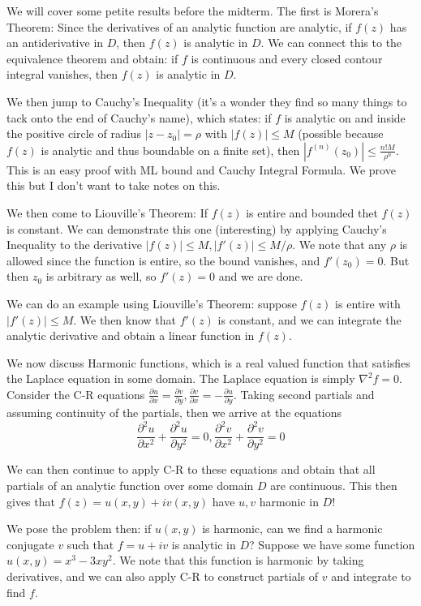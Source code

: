 \documentclass[10pt]{report}
\newcommand{\ptd}[2]{\frac{\partial^2 #1}{\partial#2^2}}
\newcommand{\pd}[2]{\frac{\partial #1}{\partial#2}}
\newcommand{\abs}[1]{\left|#1\right|}
\begin{document}
We will cover some petite results before the midterm. The first is Morera's Theorem: Since the derivatives of an analytic function are analytic, if $f(z)$ has an antiderivative in $D$, then $f(z)$ is analytic in $D$. We can connect this to the equivalence theorem and obtain: if $f$ is continuous and every closed contour integral vanishes, then $f(z)$ is analytic in $D$.

We then jump to Cauchy's Inequality (it's a wonder they find so many things to tack onto the end of Cauchy's name), which states: if $f$ is analytic on and inside the positive circle of radius $|z-z_0| = \rho$ with $\abs{f(z)} \leq M$ (possible because $f(z)$ is analytic and thus boundable on a finite set), then $\abs{f^{(n)}(z_0)} \leq \frac{n!M}{\rho^n}$. This is an easy proof with ML bound and Cauchy Integral Formula. We prove this but I don't want to take notes on this.

We then come to Liouville's Theorem: If $f(z)$ is entire and bounded thet $f(z)$ is constant. We can demonstrate this one (interesting) by applying Cauchy's Inequality to the derivative $\abs{f(z)} \leq M, \abs{f'(z)} \leq M/\rho$. We note that any $\rho$ is allowed since the function is entire, so the bound vanishes, and $f'(z_0)=0$. But then $z_0$ is arbitrary as well, so $f'(z) = 0$ and we are done.

We can do an example using Liouville's Theorem: suppose $f(z)$ is entire with $\abs{f'(z)} \leq M$. We then know that $f'(z)$ is constant, and we can integrate the analytic derivative and obtain a linear function in $f(z)$. 

We now discuss Harmonic functions, which is a real valued function that satisfies the Laplace equation in some domain. The Laplace equation is simply $\nabla^2 f = 0$. Consider the C-R equations $\pd{u}{x} = \pd{v}{y},\pd{v}{x} = -\pd{u}{y}$. Taking second partials and assuming continuity of the partials, then we arrive at the equations
$$\ptd{u}{x} + \ptd{u}{y} = 0, \ptd{v}{x} + \ptd{v}{y} = 0$$

We can then continue to apply C-R to these equations and obtain that all partials of an analytic function over some domain $D$ are continuous. This then gives that $f(z) = u(x,y) + iv(x,y)$ have $u,v$ harmonic in $D$!

We pose the problem then: if $u(x,y)$ is harmonic, can we find a harmonic conjugate $v$ such that $f = u+iv$ is analytic in $D$? Suppose we have some function $u(x,y) = x^3 - 3xy^2$. We note that this function is harmonic by taking derivatives, and we can also apply C-R to construct partials of $v$ and integrate to find $f$. 
\end{document}
